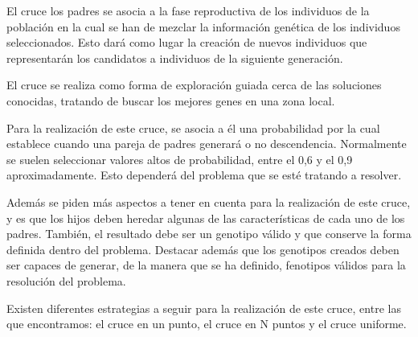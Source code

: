 El cruce los padres se asocia a la fase reproductiva de los individuos de la población en la cual se han de mezclar la información genética de los individuos seleccionados. Esto dará como lugar la creación de nuevos individuos que representarán los candidatos a individuos de la siguiente generación.

El cruce se realiza como forma de exploración guiada cerca de las soluciones conocidas, tratando de buscar los mejores genes en una zona local.

Para la realización de este cruce, se asocia a él una probabilidad por la cual establece cuando una pareja de padres generará o no descendencia. Normalmente se suelen seleccionar valores altos de probabilidad, entre el 0,6 y el 0,9 aproximadamente. Esto dependerá del problema que se esté tratando a resolver.

Además se piden más aspectos a tener en cuenta para la realización de este cruce, y es que los hijos deben heredar algunas de las características de cada uno de los padres. También, el resultado debe ser un genotipo válido y que conserve la forma definida dentro del problema. Destacar además que los genotipos creados deben ser capaces de generar, de la manera que se ha definido, fenotipos válidos para la resolución del problema.

Existen diferentes estrategias a seguir para la realización de este cruce, entre las que encontramos: el cruce en un punto, el cruce en N puntos y el cruce uniforme.

